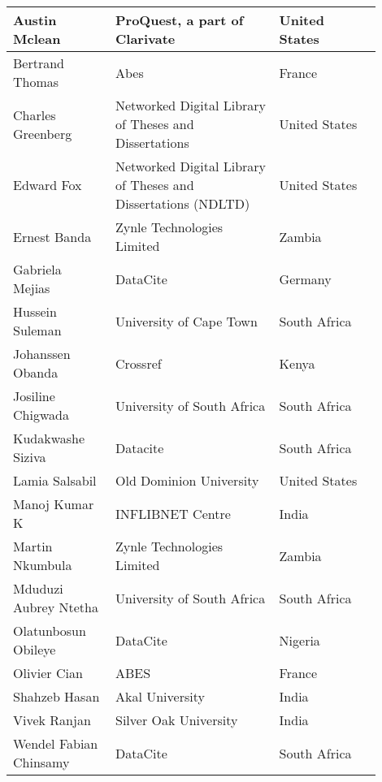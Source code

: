 
\begin{center}
\begin{longtable}{p{0.25\linewidth} p{0.4\linewidth} p{0.25\linewidth}}
\hline
Austin Mclean & ProQuest, a part of Clarivate & United States \\  \hline
Bertrand Thomas & Abes & France \\  \hline
Charles Greenberg & Networked Digital Library of Theses and Dissertations & United States \\  \hline
Edward Fox & Networked Digital Library of Theses and Dissertations (NDLTD) & United States \\  \hline
Ernest Banda & Zynle Technologies Limited & Zambia \\  \hline
Gabriela Mejias & DataCite & Germany \\  \hline
Hussein Suleman & University of Cape Town & South Africa \\  \hline
Johanssen Obanda & Crossref & Kenya \\  \hline
Josiline Chigwada & University of South Africa & South Africa \\  \hline
Kudakwashe Siziva & Datacite & South Africa \\  \hline
Lamia Salsabil & Old Dominion University & United States \\  \hline
Manoj Kumar K & INFLIBNET Centre & India \\  \hline
Martin Nkumbula & Zynle Technologies Limited & Zambia \\  \hline
Mduduzi Aubrey Ntetha & University of South Africa & South Africa \\  \hline
Olatunbosun Obileye & DataCite & Nigeria \\  \hline
Olivier Cian & ABES & France \\  \hline
Shahzeb Hasan & Akal University & India \\  \hline
Vivek Ranjan & Silver Oak University & India \\  \hline
Wendel Fabian Chinsamy & DataCite & South Africa \\  \hline
\end{longtable}
\end{center}
